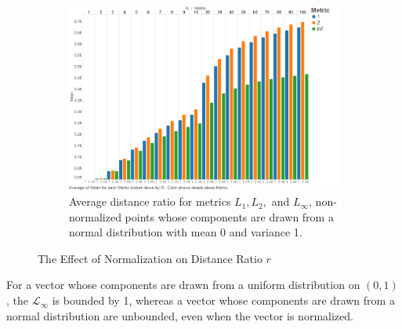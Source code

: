 \documentclass{article}
\begin{document}
\begin{figure}[H]
\centering
   \ContinuedFloat 
\begin{subfigure}[h]{0.75\textwidth}
        \includegraphics[width=1\textwidth]{exp2without_normalization.png}
        \caption{Average distance ratio for metrics $L_1,L_2,$ and $L_{\infty}$, non-normalized points whose components are drawn from a normal distribution with mean 0 and variance 1.}
        \label{fig:no_normalization}
        \end{subfigure}
        \caption{The Effect of Normalization on Distance Ratio $r$}
\end{figure}

For a vector whose components are drawn from a uniform distribution on $(0, 1)$, the $\mathcal{L}_{\infty}$ is bounded by 1, whereas a vector whose components are drawn from a normal distribution are unbounded, even when the vector is normalized.
\end{document}
